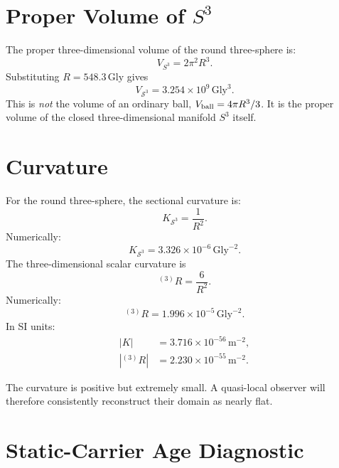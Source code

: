 \documentclass[aps,prd,onecolumn,superscriptaddress,longbibliography,nofootinbib,notitlepage]{revtex4-2}
\newcommand{\Gly}{\,\mathrm{Gly}}
\begin{document}
\section{Proper Volume of \texorpdfstring{$S^3$}{S3}}
\label{sec:volume}

The proper three-dimensional volume of the round three-sphere is:
\begin{equation}
  V_{S^3} = 2\pi^2 R^3.
\end{equation}
Substituting $R = 548.3\Gly$ gives
\begin{equation}
  \boxed{V_{\mathcal{S}^3} = 3.254\times 10^{9}\Gly^3.}
\end{equation}
This is \emph{not} the volume of an ordinary ball,
$V_{\rm ball} = 4\pi R^3/3$. It is the proper volume of the closed
three-dimensional manifold $S^3$ itself.

\section{Curvature}
\label{sec:curvature}

For the round three-sphere, the sectional curvature is:
\begin{equation}
  K_{\mathcal{S}^3} = \frac{1}{R^2}.
\end{equation}
Numerically:
\begin{equation}
  \boxed{K_{\mathcal{S}^3} = 3.326\times 10^{-6}\Gly^{-2}.}
\end{equation}
The three-dimensional scalar curvature is
\begin{equation}
  {}^{(3)}R = \frac{6}{R^2}.
\end{equation}
Numerically:
\begin{equation}
  \boxed{{}^{(3)}R = 1.996\times 10^{-5}\Gly^{-2}.}
\end{equation}
In SI units:
\begin{align}
  \boxed{|K|} &= 3.716\times 10^{-56}\,\mathrm{m}^{-2}, \\
  \boxed{|{}^{(3)}R|} &= 2.230\times 10^{-55}\,\mathrm{m}^{-2}.
\end{align}

The curvature is positive but extremely small. A quasi-local observer will
therefore consistently reconstruct their domain as nearly flat.

\section{Static-Carrier Age Diagnostic}
\label{sec:arc}
\end{document}
